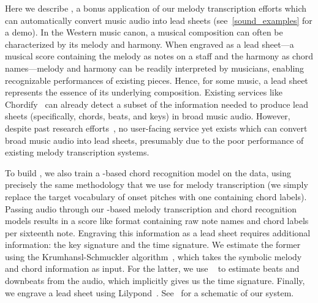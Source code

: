 Here we describe \sheetsage, a bonus application of our melody transcription efforts which can automatically convert music audio into lead sheets (see~\cref{sound_examples} for a demo). 
In the Western music canon, a musical composition can often be characterized by its melody and harmony. 
When engraved as a lead sheet---a musical score containing the melody as notes on a staff and the harmony as chord names---melody and harmony can be readily interpreted by musicians, enabling recognizable performances of existing pieces. 
Hence, for some music, a lead sheet represents the essence of its underlying composition.
Existing services like Chordify~\cite{de2014chordify} can already detect a subset of the information needed to produce lead sheets (specifically, chords, beats, and keys) in broad music audio. 
However, despite past research efforts~\cite{ryynanen2008automatic,weil2009automatic}, no user-facing service yet exists which can convert broad music audio into lead sheets, presumably due to the poor performance of existing melody transcription systems.

To build \sheetsage, we also train a \jukebox-based chord recognition model on the \hooktheory{} data, using precisely the same methodology that we use for melody transcription (we simply replace the target vocabulary of onset pitches with one containing chord labels). 
Passing audio through our \jukebox{}-based melody transcription and chord recognition models results in a score like format containing raw note names and chord labels per sixteenth note. 
Engraving this information as a lead sheet requires additional information: the key signature and the time signature. 
We estimate the former using the Krumhansl-Schmuckler algorithm~\cite{krumhansl1990cognitive,temperley1999key}, which takes the symbolic melody and chord information as input. 
For the latter, we use \madmom~\cite{bock2016madmom,bock2016joint} to estimate beats and downbeats from the audio, which implicitly gives us the time signature.
Finally, we engrave a lead sheet using Lilypond~\cite{nienhuys2003lilypond}. 
See~ for a schematic of our system.

